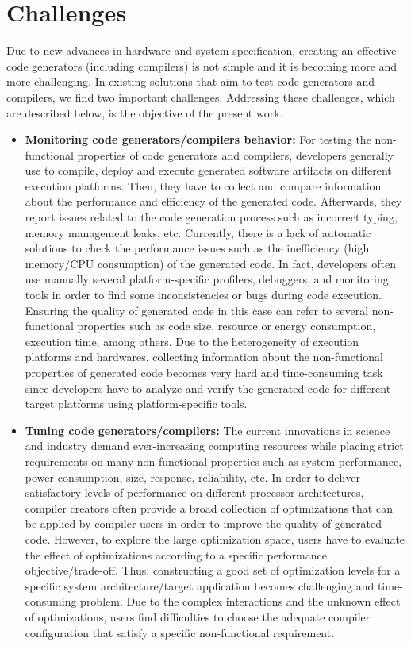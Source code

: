 \section{Challenges}
Due to new advances in hardware and system specification, creating an effective code generators (including compilers) is not simple and it is becoming more and more challenging.
In existing solutions that aim to test code generators and compilers, we find two important challenges. Addressing these challenges, which are described below, is the objective of the present work.
\begin{itemize}
\item
\textbf{Monitoring code generators/compilers behavior:} For testing the non-functional properties of code generators and compilers, developers generally use to compile, deploy and execute generated software artifacts on different execution platforms. Then, they have to collect and compare information about the performance and efficiency of the generated code. Afterwards, they report issues related to the code generation process such as incorrect typing, memory management leaks, etc.
Currently, there is a lack of automatic solutions to check the performance issues such as the inefficiency (high memory/CPU consumption) of the generated code. In fact, developers often use manually several platform-specific profilers, debuggers, and monitoring tools\cite{guana2014chaintracker,delgado2004taxonomy} in order to find some inconsistencies or bugs during code execution. Ensuring the quality of generated code in this case can refer to several non-functional properties such as code size, resource or energy consumption, execution time, among others\cite{pan2006fast}. Due to the heterogeneity of execution platforms and hardwares, collecting information about the non-functional properties of generated code becomes very hard and time-consuming task since developers have to analyze and verify the generated code for different target platforms using platform-specific tools. 
\item
\textbf{Tuning code generators/compilers:} The current innovations in science and industry demand ever-increasing computing resources while placing strict requirements on many non-functional properties such as system performance, power consumption, size, response, reliability, etc. In order to deliver satisfactory levels of performance on different processor architectures, compiler creators often provide a broad collection of optimizations that can be applied by compiler users in order to improve the quality of generated code. However, to explore the large optimization space, users have to evaluate the effect of optimizations according to a specific performance objective/trade-off. Thus, constructing a good set of optimization levels for a specific system architecture/target application becomes challenging and time-consuming problem. Due to the complex interactions and the unknown effect of optimizations, users find difficulties to choose the adequate compiler configuration that satisfy a specific non-functional requirement.






\end{itemize}
